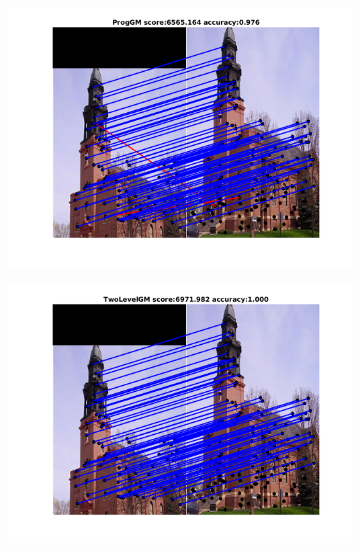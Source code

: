 \begin{figure}[h]
	\begin{subfigure}[b]{0.33\textwidth}
		\centering
		\includegraphics[scale=0.25]{"chapter3/fig/ImageTrafo/anchor_descr/using_cpd_afftrafo/fi_2_ProgGM"} 
	\end{subfigure}%
	\begin{subfigure}[b]{0.33\textwidth}
		\centering
		\includegraphics[scale=0.25]{"chapter3/fig/ImageTrafo/anchor_descr/using_cpd_afftrafo/fi_2_TwoLevelGM"} 
	\end{subfigure} 
	\begin{subfigure}[b]{0.33\textwidth}
		\centering

\end{subfigure}
\end{figure}
